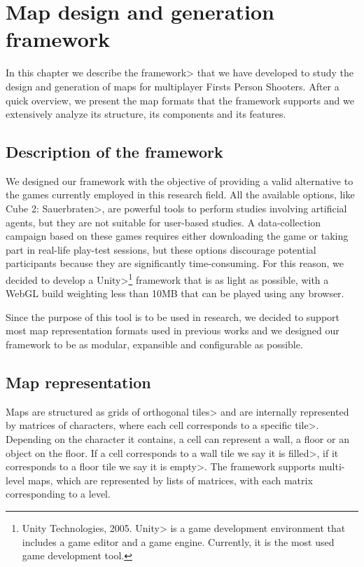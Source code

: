 \chapter{Map design and generation framework}


In this chapter we describe the \<framework> that we have developed to study the design and generation of maps for multiplayer Firsts Person Shooters. After a quick overview, we present the map formats that the framework supports and we extensively analyze its structure, its components and its features.


\section{Description of the framework}

We designed our framework with the objective of providing a valid alternative to the games currently employed in this research field. All the available options, like \<Cube 2: Sauerbraten>, are powerful tools to perform studies involving artificial agents, but they are not suitable for user-based studies. A data-collection campaign based on these games requires either downloading the game or taking part in real-life play-test sessions, but these options discourage potential participants because they are significantly time-consuming. For this reason, we decided to develop a \<Unity>\footnote{Unity Technologies, 2005. \<Unity> is a game development environment that includes a game editor and a game engine. Currently, it is the most used game development tool.} framework that is as light as possible, with a WebGL build weighting less than 10MB that can be played using any browser.

\par

Since the purpose of this tool is to be used in research, we decided to support most map representation formats used in previous works and we designed our framework to be as modular, expansible and configurable as possible.


\section{Map representation}

Maps are structured as grids of orthogonal \<tiles> and are internally represented  by matrices of characters, where each cell corresponds to a specific \<tile>. Depending on the character it contains, a cell can represent a wall, a floor or an object on the floor. If a cell corresponds to a wall tile we say it is \<filled>, if it corresponds to a floor tile we say it is \<empty>. The framework supports multi-level maps, which are represented by lists of matrices, with each matrix corresponding to a level.

